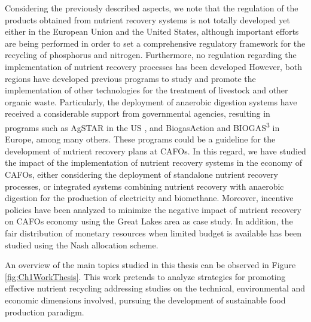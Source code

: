 \begin{refsection}[referencesCh1]
Considering the previously described aspects, we note that the regulation of the products obtained from nutrient recovery systems is not totally developed yet either in the European Union and the United States, although important efforts are being performed in order to set a comprehensive regulatory framework for the recycling of phosphorus and nitrogen. Furthermore, no regulation regarding the implementation of nutrient recovery processes has been developed
However, both regions have developed previous programs to study and promote the implementation of other technologies for the treatment of livestock and other organic waste. Particularly, the deployment of anaerobic digestion systems have received a considerable support from governmental agencies, resulting in programs such as AgSTAR in the US \citep{AgSTARProgram}, and BiogasAction \citep{BiogasAction} and BIOGAS\textsuperscript{3} \citep{BIOGAS3PROJECT} in Europe, among many others. These programs could be a guideline for the development of nutrient recovery plans at CAFOs. In this regard, we have studied the impact of the implementation of nutrient recovery systems in the economy of CAFOs, either considering the deployment of standalone nutrient recovery processes, or integrated systems combining nutrient recovery with anaerobic digestion for the production of electricity and biomethane. Moreover, incentive policies have been analyzed to minimize the negative impact of nutrient recovery on CAFOs economy using the Great Lakes area as case study. In addition, the fair distribution of monetary resources when limited budget is available has been studied using the Nash allocation scheme. 

An overview of the main topics studied in this thesis can be observed in Figure \ref{fig:Ch1WorkThesis}. This work pretends to analyze strategies for promoting effective nutrient recycling addressing studies on the technical, environmental and economic dimensions involved, pursuing the development of sustainable food production paradigm.


\end{refsection}
